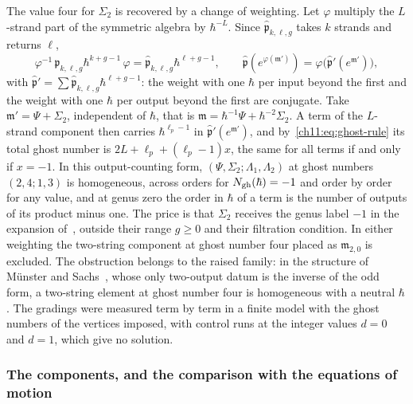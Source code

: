 The value four for $\Sigma_2$ is recovered by a change of weighting.
Let $\varphi$ multiply the $L$-strand part of the symmetric algebra by $\hbar^{-L}$.
Since $\hat{\mathfrak{p}}_{k, \ell, g}$ takes $k$ strands and returns $\ell$,
\begin{equation}
  \label{ch11:eq:conjugation}
  \varphi^{-1} \, \hat{\mathfrak{p}}_{k, \ell, g} \hbar^{k + g - 1} \, \varphi
    = \hat{\mathfrak{p}}_{k, \ell, g} \hbar^{\ell + g - 1},
  \qquad
  \hat{\mathfrak{p}}(e^{\varphi(\mathfrak{m}')})
    = \varphi \bigl( \hat{\mathfrak{p}}'(e^{\mathfrak{m}'}) \bigr),
\end{equation}
with $\hat{\mathfrak{p}}' = \sum \hat{\mathfrak{p}}_{k, \ell, g} \hbar^{\ell + g - 1}$: the weight with one $\hbar$ per input beyond the first and the weight with one $\hbar$ per output beyond the first are conjugate.
Take $\mathfrak{m}' = \Psi + \Sigma_2$, independent of $\hbar$, that is $\mathfrak{m} = \hbar^{-1} \Psi + \hbar^{-2} \Sigma_2$.
A term of the $L$-strand component then carries $\hbar^{\ell_p - 1}$ in $\hat{\mathfrak{p}}'(e^{\mathfrak{m}'})$, and by~\eqref{ch11:eq:ghost-rule} its total ghost number is $2 L + \ell_p + (\ell_p - 1) x$, the same for all terms if and only if $x = -1$.
In this output-counting form, $(\Psi, \Sigma_2; \Lambda_1, \Lambda_2)$ at ghost numbers $(2, 4; 1, 3)$ is homogeneous, across orders for $N_{\text{gh}}(\hbar) = -1$ and order by order for any value, and at genus zero the order in $\hbar$ of a term is the number of outputs of its product minus one.
The price is that $\Sigma_2$ receives the genus label $-1$ in the expansion of~\cite{Cieliebak:2015:HomologicalAlgebraRelated}, outside their range $g \ge 0$ and their filtration condition.
In either weighting the two-string component at ghost number four placed as $\mathfrak{m}_{2, 0}$ is excluded.
The obstruction belongs to the raised family: in the structure of Münster and Sachs~\cite{MunsterSachs2013}, whose only two-output datum is the inverse of the odd form, a two-string element at ghost number four is homogeneous with a neutral $\hbar$.
The gradings were measured term by term in a finite model with the ghost numbers of the vertices imposed, with control runs at the integer values $d = 0$ and $d = 1$, which give no solution.

\subsubsection{The components, and the comparison with the equations of motion}

